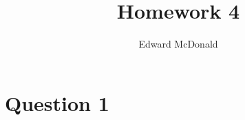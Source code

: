 \documentclass{unswmaths}
\begin{document}
\subject{Measure Theory}
\author{Edward McDonald}
\title{Homework 4}


\setlength\parindent{0pt}


\newcommand{\Bor}{\mathcal{B}(\Rl)}
\newcommand{\sdiff}{\bigtriangleup}

\unswtitle{}


\section*{Question 1}
\end{document}
